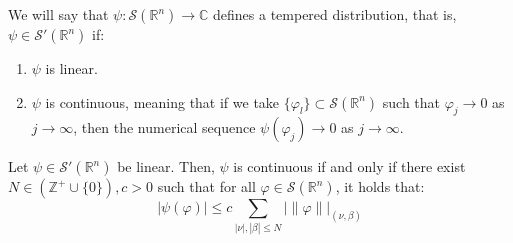 \begin{definition}{}
	We will say that $\psi:\mathcal{S}(\mathbb{R}^n)\rightarrow \mathbb{C}$ defines a tempered distribution, that is, $\psi\in\mathcal{S}'(\mathbb{R}^n)$ if:
	\begin{enumerate}
		\item $\psi$ is linear.
		\item $\psi$ is continuous, meaning that if we take $\{\varphi_l\}\subset\mathcal{S}(\mathbb{R}^n)$ such that $\varphi_j\rightarrow 0$ as $j\rightarrow \infty$, then the numerical sequence $\psi(\varphi_j)\rightarrow 0$ as $j\rightarrow \infty$.
	\end{enumerate}
\end{definition}
\begin{proposition}{}
	Let $\psi\in\mathcal{S}'(\mathbb{R}^n)$ be linear. Then, $\psi$ is continuous if and only if there exist $N\in(\mathbb{Z}^+\cup\{0\}),c>0$ such that for all $\varphi\in\mathcal{S}(\mathbb{R}^n)$, it holds that:
	$$|\psi(\varphi)|\leq c\sum_{|\nu|,|\beta|\leq N}|\|\varphi\||_{(\nu,\beta)}$$
\end{proposition}
